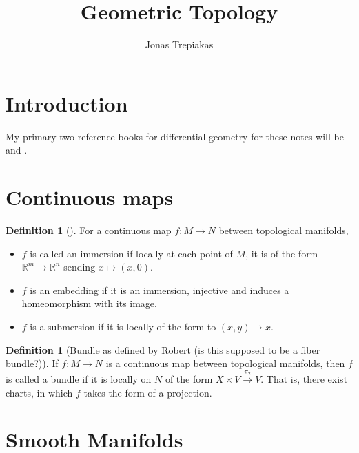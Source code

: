 \documentclass[reqno]{amsart}
\title{Geometric Topology}
\author{Jonas Trepiakas}
\date{}
\theoremstyle{definition}
\newtheorem{definition}[theorem]{Definition}
\theoremstyle{remark}
\begin{document}
\maketitle

\tableofcontents


\section{Introduction}

My primary two reference books for differential geometry
for these notes will be \cite{KMS} and \cite{LeeSM}.


\section{Continuous maps}


    \begin{definition}[]
        For a continuous map $f \colon M \to N$ between 
        topological manifolds,
        \begin{itemize}
            \item $f$ is called
                an immersion if
                locally at each point of $M$,
                it is of the form
                $\mathbb{R}^{m} \to \mathbb{R}^{n}$ 
                sending $x \mapsto \left( x,0 \right) $.
            \item $f$ is an embedding if it is
                an immersion, injective and induces a homeomorphism
                with
                its image.
            \item $f$ is a submersion if it is locally
                of the form to
                $\left( x,y \right) \mapsto x$.
        \end{itemize}
    \end{definition}

    \begin{definition}[Bundle as defined by
        Robert (is this supposed to be a fiber bundle?)]
        If 
        $f \colon M \to N$ is a continuous
        map between topological manifolds, then
        $f$ is called a bundle if it is locally
        on $N$ of the form
        $X \times V \stackrel{\pi_2}{\to } V$.
        That is, there
        exist charts, in which
        $f$ takes the form of a projection.
    \end{definition}

\section{Smooth Manifolds}
\end{document}

